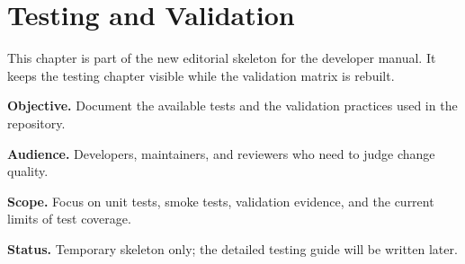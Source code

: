 \chapter{Testing and Validation}
\label{chap:testing-and-validation}

This chapter is part of the new editorial skeleton for the developer manual. It keeps the testing chapter visible while the validation matrix is rebuilt.

\noindent\textbf{Objective.} Document the available tests and the validation practices used in the repository.

\noindent\textbf{Audience.} Developers, maintainers, and reviewers who need to judge change quality.

\noindent\textbf{Scope.} Focus on unit tests, smoke tests, validation evidence, and the current limits of test coverage.

\noindent\textbf{Status.} Temporary skeleton only; the detailed testing guide will be written later.

